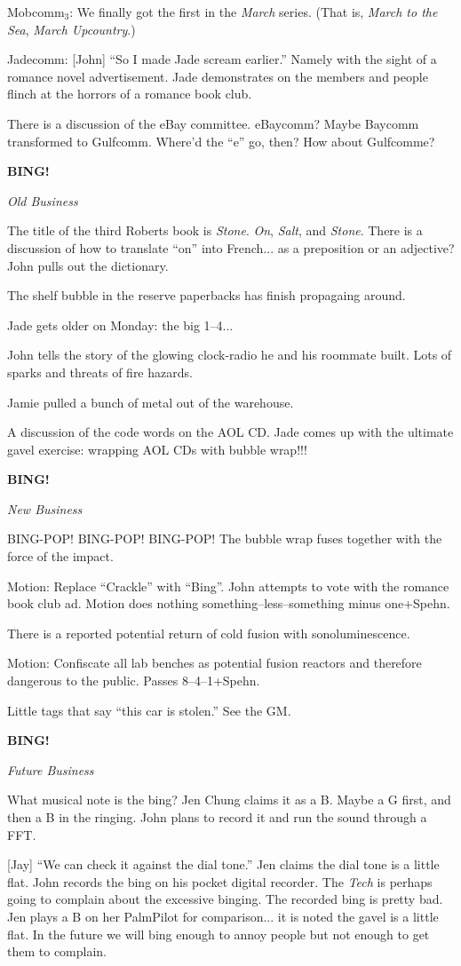 \documentclass[12pt]{article}
\newcommand{\bing}{{\bf BING!} }
\newcommand{\goto}[1]{\bing \vskip 12pt \centerline{{\em{#1}}}}
\begin{document}
Mobcomm$_3$: We finally got the first in the {\em March} series.  (That
is, {\em March to the Sea}, {\em March Upcountry}.)

Jadecomm: [John] ``So I made Jade scream earlier.''  Namely with the
sight of a romance novel advertisement.  Jade demonstrates on the
members and people flinch at the horrors of a romance book club.

There is a discussion of the eBay committee.  eBaycomm?  Maybe Baycomm
transformed to Gulfcomm.  Where'd the ``e'' go, then?  How about
Gulfcomme?

\goto{Old Business}

The title of the third Roberts book is {\em Stone}.  {\em On}, {\em Salt},
and {\em Stone}.  There is a discussion of how to translate ``on'' into
French... as a preposition or an adjective?  John pulls out the
dictionary.

The shelf bubble in the reserve paperbacks has finish propagaing around.

Jade gets older on Monday: the big 1--4...

John tells the story of the glowing clock-radio he and his roommate
built.  Lots of sparks and threats of fire hazards.

Jamie pulled a bunch of metal out of the warehouse.

A discussion of the code words on the AOL CD.  Jade comes up with
the ultimate gavel exercise: wrapping AOL CDs with bubble wrap!!!

\goto{New Business}

BING-POP!  BING-POP!  BING-POP!  The bubble wrap fuses together
with the force of the impact.

Motion: Replace ``Crackle'' with ``Bing''.  John attempts to vote with
the romance book club ad.  Motion does nothing something--less--something
minus one+Spehn.

There is a reported potential return of cold fusion with sonoluminescence.

Motion: Confiscate all lab benches as potential fusion reactors and
therefore dangerous to the public.  Passes 8--4--1+Spehn.

Little tags that say ``this car is stolen.''  See the GM.

\goto{Future Business}

What musical note is the bing?  Jen Chung claims it as a B.  Maybe a
G first, and then a B in the ringing.  John plans to record it and
run the sound through a FFT.

[Jay] ``We can check it against the dial tone.''  Jen claims the dial
tone is a little flat.  John records the bing on his pocket digital
recorder.  The {\em Tech} is perhaps going to complain about the
excessive binging.  The recorded bing is pretty bad.  Jen plays a B
on her PalmPilot for comparison... it is noted the gavel is a little
flat.  In the future we will bing enough to annoy people but not enough
to get them to complain.
\end{document}
